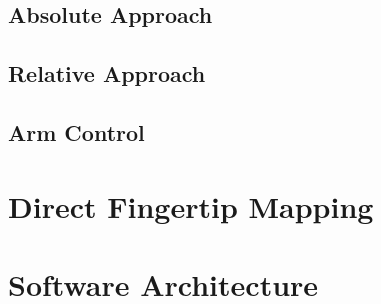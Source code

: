 \subsection{Absolute Approach}
\label{sec:synergies:absolute}

\subsection{Relative Approach}

\subsection{Arm Control}

\section{Direct Fingertip Mapping}

\section{Software Architecture}